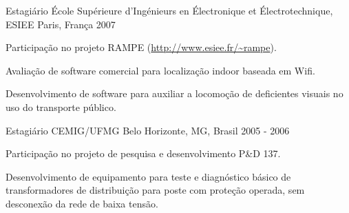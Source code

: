 \begin{cventries}
  \cventry
    {Estagiário} %
    {École Supérieure d’Ingénieurs en Électronique et Électrotechnique, ESIEE} %
    {Paris, França} %
    {2007} %
    {
      \begin{cvitems} %
        \item {Participação no projeto RAMPE (\url{http://www.esiee.fr/~rampe}).}
        \item {Avaliação de software comercial para localização indoor baseada em Wifi.}
        \item {Desenvolvimento de software para auxiliar a locomoção de deficientes visuais no uso do transporte público.}
      \end{cvitems}
    }

  \cventry
    {Estagiário} %
    {CEMIG/UFMG} %
    {Belo Horizonte, MG, Brasil} %
    {2005 - 2006} %
    {
      \begin{cvitems} %
        \item {Participação no projeto de pesquisa e desenvolvimento P\&D 137.}
        \item {Desenvolvimento de equipamento para teste e diagnóstico básico de transformadores de distribuição para poste com proteção operada, sem desconexão da rede de baixa tensão.}
      \end{cvitems}
    }

\end{cventries}
